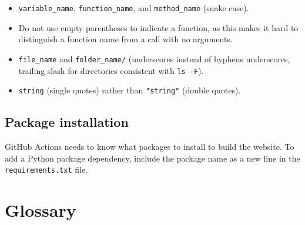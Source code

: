 \documentclass[
]{krantz}
\begin{document}
\begin{itemize}
\item
  \texttt{variable\_name}, \texttt{function\_name}, and \texttt{method\_name} (snake case).
\item
  Do not use empty parentheses to indicate a function, as this makes it hard to
  distinguish a function name from a call with no arguments.
\item
  \texttt{file\_name} and \texttt{folder\_name/} (underscores instead of hyphens underscores,
  trailing slash for directories consistent with \texttt{ls\ -F}).
\item
  \texttt{\textquotesingle{}string\textquotesingle{}} (single quotes) rather than \texttt{"string"} (double quotes).
\end{itemize}

\hypertarget{package-installation}{%
\section*{Package installation}\label{package-installation}}


GitHub Actions needs to know what packages to install to build the website. To
add a Python package dependency, include the package name as a new line in the
\texttt{requirements.txt} file.

\hypertarget{glossary}{%
\chapter{Glossary}\label{glossary}}
\end{document}
